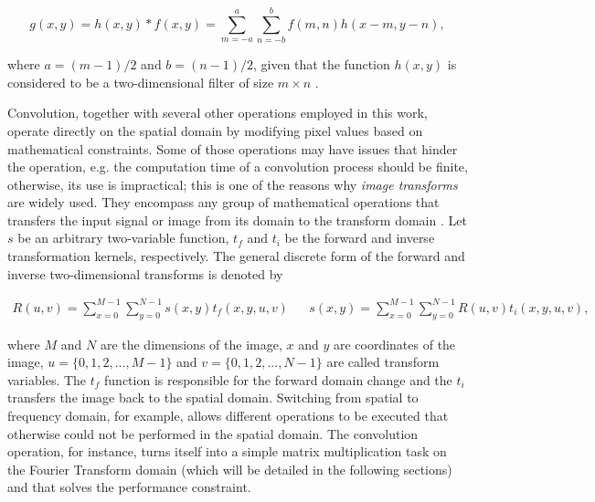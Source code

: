 \begin{equation}
\label{eqn:2d_discrete_convolution}
g(x,y) = h(x,y) \ast f(x,y) = 
        \sum_{m=-a}^{a}
        \sum_{n=-b}^{b}
        f(m,n) h(x-m,y-n),
\end{equation}

\noindent where $a = (m-1)/2$ and $b = (n-1)/2$, given that the function $h(x,y)$ is considered to be a two-dimensional filter of size $m \times n$ \cite{gonzalez2018digital}.

Convolution, together with several other operations employed in this work, operate directly on the spatial domain by modifying pixel values based on mathematical constraints. Some of those operations may have issues that hinder the operation, e.g. the computation time of a convolution process should be finite, otherwise, its use is impractical; this is one of the reasons why \emph{image transforms} are widely used. They encompass any group of mathematical operations that transfers the input signal or image from its domain to the transform domain \cite{gonzalez2008digital}. Let $s$ be an arbitrary two-variable function, $t_{f}$ and $t_{i}$ be the forward and inverse transformation kernels, respectively. The general discrete form of the forward and inverse two-dimensional transforms is denoted by 

\begin{align}
\label{eqn:generic_transform}
R(u,v) = 
\sum_{x=0}^{M-1}
\sum_{y=0}^{N-1}s(x,y)t_{f}(x,y,u,v)
&&
s(x,y) = 
\sum_{x=0}^{M-1}
\sum_{y=0}^{N-1}R(u,v)t_{i}(x,y,u,v),
\end{align}

\noindent where $M$ and $N$ are the dimensions of the image, $x$ and $y$ are coordinates of the image, $u = \{0,1,2,...,M-1\}$ and $v = \{0,1,2,...,N-1\}$ are called transform variables. The $t_{f}$ function is responsible for the forward domain change and the $t_{i}$ transfers the image back to the spatial domain. Switching from spatial to frequency domain, for example, allows different operations to be executed that otherwise could not be performed in the spatial domain. The convolution operation, for instance, turns itself into a simple matrix multiplication task on the Fourier Transform domain (which will be detailed in the following sections) and that solves the performance constraint.
